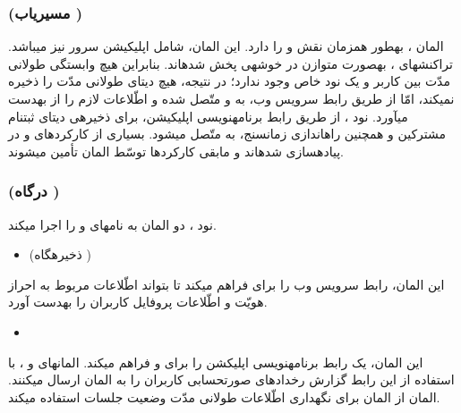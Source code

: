 \subsubsection{ (مسیریاب  )}
المان ، به\nf طور هم\nf زمان نقش  و  را دارد. این المان، شامل اپلیکیشن سرور  نیز می\nf باشد. تراکنش\nf های ، به\nf صورت متوازن در خوشه\nf ی  پخش شده\nf اند. بنابراین هیچ وابستگی طولانی مدّت بین کاربر و یک نود خاص  وجود ندارد؛ در نتیجه،   هیچ دیتای طولانی مدّت را ذخیره نمی\nf کند، امّا از طریق رابط سرویس وب، به  و  متّصل شده و اطّلاعات لازم را از  به\nf دست می\nf آورد. نود ، از طریق رابط برنامه\nf نویسی اپلیکیشن، برای ذخیره\nf ی دیتای ثبت\nf نام مشترکین و همچنین راه\nf اندازی زمان\nf سنج، به  متّصل می\nf شود. بسیاری از کارکردهای  و  در  پیاده\nf سازی شده\nf اند و مابقی کارکردها توسّط المان  تأمین می\nf شوند.

\subsubsection{ (درگاه ) }
\label{dime}
نود ، دو المان  به نام\nf های  و  را اجرا می\nf کند.
\begin{itemize}
\item {} (ذخیره\nf گاه )
\end{itemize}

\indent این المان، رابط سرویس وب را برای  فراهم می\nf کند تا  بتواند اطّلاعات مربوط به احراز هویّت و اطّلاعات پروفایل کاربران را به\nf دست آورد.

\begin{itemize}
\item {}
\end{itemize}

\indent این المان، یک رابط برنامه\nf نویسی اپلیکشن  را برای  و  فراهم می\nf کند. المان\nf های  و ، با استفاده از این رابط گزارش رخدادهای صورت\nf حسابی کاربران را به المان  ارسال می\nf کنند. المان  از المان  برای نگه\nf داری اطّلاعات طولانی مدّت وضعیت جلسات استفاده می\nf کند.



